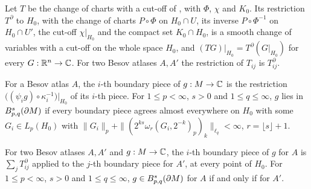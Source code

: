 \begin{definition}
\label{def:boundary-chart-change}
\leanok
{}
Let $T$ be the change of charts with a cut-off of , with $\Phi$, $\chi$
and $K_0$. Its restriction $T^\partial$ to $H_0$, with the change of charts $P \circ \Phi$ on
$H_0 \cap U$, its inverse $P \circ \Phi^{-1}$ on $H_0 \cap U'$, the cut-off $\chi|_{H_0}$ and the
compact set $K_0 \cap H_0$, is a smooth change of variables with a cut-off on the whole space
$H_0$, and $(T G)|_{H_0} = T^\partial(G|_{H_0})$ for every $G : \mathbb{R}^n \to \mathbb{C}$. For two Besov
atlases $A, A'$ the restriction of $T_{ij}$ is $T^\partial_{ij}$.
\end{definition}

\begin{definition}
\label{def:manifold-boundary-besov}
\leanok
{}
For a Besov atlas $A$, the $i$-th boundary piece of $g : M \to \mathbb{C}$ is the restriction
$\bigl((\psi_i g) \circ \kappa_i^{-1}\bigr)|_{H_0}$ of its $i$-th piece. For $1 \leq p < \infty$,
$s > 0$ and $1 \leq q \leq \infty$, $g$ lies in $B^{s}_{p,q}(\partial M)$ if every boundary
piece agrees almost everywhere on $H_0$ with some $G_i \in L_p(H_0)$ with
$\|G_i\|_p + \|(2^{ks} \omega_r(G_i, 2^{-k})_p)_k\|_{\ell_q} < \infty$, $r = \lfloor s \rfloor + 1$.
\end{definition}

\begin{theorem}
\label{thm:boundary-atlas-independence}
\leanok
{}
For two Besov atlases $A, A'$ and $g : M \to \mathbb{C}$, the $i$-th boundary piece of $g$ for $A$ is
$\sum_j T^\partial_{ij}$ applied to the $j$-th boundary piece for $A'$, at every point of $H_0$.
For $1 \leq p < \infty$, $s > 0$ and $1 \leq q \leq \infty$, $g \in B^{s}_{p,q}(\partial M)$
for $A$ if and only if for $A'$.
\end{theorem}

